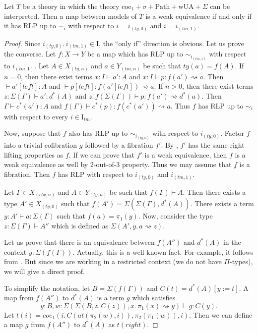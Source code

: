\documentclass{mscs}
\newcommand{\repl}{:=}
\newcommand{\idtype}{\rightsquigarrow}
\newcommand{\wUA}{\mathrm{wUA}}
\newcommand{\coe}{\mathrm{coe}}
\newcommand{\Path}{\mathrm{Path}}
\newcommand{\I}{\mathrm{I}}
\numberwithin{figure}{section}
\begin{document}
\begin{prop}[sigma-we-i]
Let $T$ be a theory in which the theory $\coe_1 + \sigma + \Path + \wUA + \Sigma$ can be interpreted.
Then a map between models of $T$ is a weak equivalence if and only if it has RLP up to $\sim_i$ with respect to $i = i_{(ty,0)}$ and $i = i_{(tm,1)}$.
\end{prop}
\begin{proof}
Since $i_{(ty,0)},i_{(tm,1)} \in \I$, the ``only if'' direction is obvious.
Let us prove the converse.
Let $f : X \to Y$ be a map which has RLP up to $\sim_{i_{(tm,1)}}$ with respect to $i_{(tm,1)}$.
Let $A \in X_{(ty,n)}$ and $a \in Y_{(tm,n)}$ be such that $ty(a) = f(A)$.
If $n = 0$, then there exist terms $x : I \vdash a' : A$ and $x : I \vdash p : f(a') \idtype a$.
Then $\vdash a'[left] : A$ and $\vdash p[left] : f(a'[left]) \idtype a$.
If $n > 0$, then there exist terms $z : \Sigma(\Gamma) \vdash a' : d^*(A)$ and $z : f(\Sigma(\Gamma)) \vdash p : f(a') \idtype d^*(a)$.
Then $\Gamma \vdash c^*(a') : A$ and $f(\Gamma) \vdash c^*(p) : f(c^*(a')) \idtype a$.
Thus $f$ has RLP up to $\sim_i$ with respect to every $i \in \I_{tm}$.

Now, suppose that $f$ also has RLP up to $\sim_{i_{(ty,0)}}$ with respect to $i_{(ty,0)}$.
Factor $f$ into a trivial cofibration $g$ followed by a fibration $f'$.
By \cite[lemma~3.4]{f-model-structures}, $f'$ has the same right lifting properties as $f$.
If we can prove that $f'$ is a weak equivalence, then $f$ is a weak equivalence as well by 2-out-of-3 property.
Thus we may assume that $f$ is a fibration.
Then $f$ has RLP with respect to $i_{(ty,0)}$ and $i_{(tm,1)}$.

Let $\Gamma \in X_{(ctx,n)}$ and $A \in Y_{(ty,n)}$ be such that $f(\Gamma) \vdash A$.
Then there exists a type $A' \in X_{(ty,0)}$ such that $f(A') = \Sigma(\Sigma(\Gamma), d^*(A))$.
There exists a term $y : A' \vdash a : \Sigma(\Gamma)$ such that $f(a) = \pi_1(y)$.
Now, consider the type $z : \Sigma(\Gamma) \vdash A''$ which is defined as $\Sigma(A', y.\,a \idtype z)$.

Let us prove that there is an equivalence between $f(A'')$ and $d^*(A)$ in the context $y : \Sigma(f(\Gamma))$.
Actually, this is a well-known fact.
For example, it follows from \cite[lemmas 3.11.8 and 3.11.9]{hottbook}.
But since we are working in a restricted context (we do not have $\Pi$-types), we will give a direct proof.

To simplify the notation, let $B = \Sigma(f(\Gamma))$ and $C(t) = d^*(A)[y \repl t]$.
A map from $f(A'')$ to $d^*(A)$ is a term $g$ which satisfies
\[ y : B, w : \Sigma(\Sigma(B, z.\,C(z)), x.\,\pi_1(x) \idtype y) \vdash g : C(y). \]
Let $t(i) = coe_1(i.\,C(at(\pi_2(w),i)), \pi_2(\pi_1(w)), i)$.
Then we can define a map $g$ from $f(A'')$ to $d^*(A)$ as $t(right)$.


\end{proof}
\end{document}
